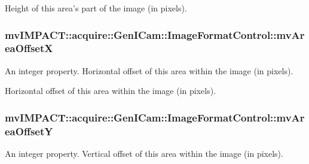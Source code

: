 Height of this area's part of the image (in pixels). \hypertarget{classmv_i_m_p_a_c_t_1_1acquire_1_1_gen_i_cam_1_1_image_format_control_a78f0647bc26627d3b47d3600beca1586}{
\subsubsection[{mv\+Area\+Offset\+X}]{ mv\+I\+M\+P\+A\+C\+T\+::acquire\+::\+Gen\+I\+Cam\+::\+Image\+Format\+Control\+::mv\+Area\+Offset\+X}}\label{classmv_i_m_p_a_c_t_1_1acquire_1_1_gen_i_cam_1_1_image_format_control_a78f0647bc26627d3b47d3600beca1586}


An integer property. Horizontal offset of this area within the image (in pixels). 

Horizontal offset of this area within the image (in pixels). \hypertarget{classmv_i_m_p_a_c_t_1_1acquire_1_1_gen_i_cam_1_1_image_format_control_a413bde6385d3cdf6265e7bf2dabe2fd6}{
\subsubsection[{mv\+Area\+Offset\+Y}]{ mv\+I\+M\+P\+A\+C\+T\+::acquire\+::\+Gen\+I\+Cam\+::\+Image\+Format\+Control\+::mv\+Area\+Offset\+Y}}\label{classmv_i_m_p_a_c_t_1_1acquire_1_1_gen_i_cam_1_1_image_format_control_a413bde6385d3cdf6265e7bf2dabe2fd6}


An integer property. Vertical offset of this area within the image (in pixels). 

